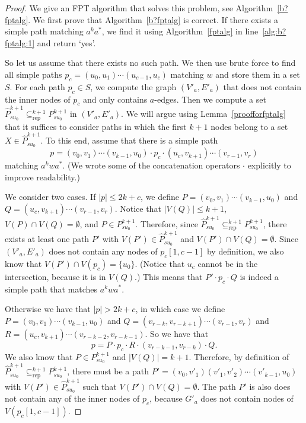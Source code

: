 \documentclass[a4paper,english]{lipics-v2016}
\theoremstyle{plain}
\begin{document}
\WConstOrNOTIsFPT*
\begin{proof}
          We give an FPT algorithm that solves this problem, see
  Algorithm~\ref{b?fptalg}.
  We first prove that Algorithm~\ref{b?fptalg} is correct.  If
  there exists a simple path matching $a^ka^*$, we find it using
  Algorithm~\ref{fptalg} in line~\ref{alg:b?fptalg:1} and return `yes'.

  So let us assume that there exists no such path.  We then use brute
  force to find all simple paths $p_c=(u_0,u_1)\cdots (u_{c-1},u_c)$
  matching $w$ and store them in a set $S$.   For each path $p_c \in S$, we compute the graph
  $(V'_a,E'_a)$ that does not contain the inner nodes of $p_c$ and
  only contains $a$-edges. Then we compute a set
  $\hat{P}^{k+1}_{su_0} \subseteq^{k+1}_\text{rep} P^{k+1}_{su_0}$ in
  $(V'_a,E'_a)$. We will
  argue using Lemma~\ref{proofforfptalg} that it suffices to consider
  paths in which the first $k+1$ nodes belong to a set $X \in
  \hat{P}^{k+1}_{su_0}$. To this end, assume that there is a
  simple path $$p = (v_0,v_1) \cdots (v_{k-1},u_0) \cdot p_c \cdot (u_c,v_{k+1})
  \cdots (v_{r-1},v_r)$$ matching $a^kwa^*$.  (We wrote some of the
  concatenation operators $\cdot$ explicitly to improve readability.)

  We consider two cases. If $|p| \leq
  2k+c$, we define $P= (v_0,v_1) \cdots (v_{k-1},u_0)$ and
  $Q=(u_c,v_{k+1}) \cdots \allowbreak (v_{r-1},v_r)$. Notice that
  $|V(Q)| \leq k+1$, $V(P)\cap V(Q) = \emptyset$, and $P \in  P^{k+1}_{su_0}$.
  Therefore, since $\hat{P}^{k+1}_{su_0}
  \subseteq^{k+1}_\text{rep} P^{k+1}_{su_0}$, there exists at least one
  path $P'$ with $V(P') \in \hat{P}^{k+1}_{su_0}$ and $V(P')\cap
  V(Q)=\emptyset$.  
  Since  $(V'_a,E'_a)$ does not contain any nodes
  of $p_c[1,c-1]$ by definition, we also know that $V(P') \cap V(p_c) =
  \{u_0\}$. (Notice that $u_c$ cannot be in the intersection, because
  it is in $V(Q)$.) This means that $P' \cdot p_c\cdot Q$ is indeed a simple path that matches $a^kwa^*$. 
	
  Otherwise we have that $|p| > 2k+c$, in which case we define $P= (v_0,v_1) \cdots (v_{k-1},u_0)$
  and $Q=(v_{r-k},v_{r-k+1}) \cdots \allowbreak (v_{r-1},v_r)$ and $R
  = (u_c,v_{k+1}) \cdots (v_{r-k-2},v_{r-k-1})$. So we have that 
  $$p = P \cdot p_c \cdot R\cdot (v_{r-k-1},v_{r-k}) \cdot Q.$$
  We also know that $P \in  P^{k+1}_{su_0}$ and $|V(Q)| = k+1$.
  Therefore, by
  definition of $\hat{P}^{k+1}_{su_0} \subseteq^{k+1}_\text{rep}
  P^{k+1}_{su_0}$, there must be a path $P'=(v_0,v'_1)(v'_1,v'_2)\cdots(v'_{k-1},u_0)$ with $V(P') \in
  \hat{P}^{k+1}_{su_0}$ such that $V(P')\cap V(Q) = \emptyset$. The
  path $P'$ is also does not contain any of the inner nodes of $p_c$, because $G'_a$ does not
  contain nodes of
  $V(p_c[1,c-1])$. 
	

\end{proof}
\end{document}
